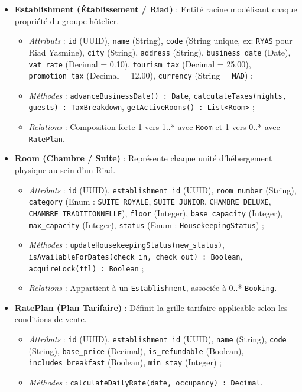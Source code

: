 \begin{itemize}
    \item \textbf{Establishment (Établissement / Riad)} : Entité racine modélisant chaque propriété du groupe hôtelier.
    \begin{itemize}
        \item \textit{Attributs} : \texttt{id} (UUID), \texttt{name} (String), \texttt{code} (String unique, ex: \texttt{RYAS} pour Riad Yasmine), \texttt{city} (String), \texttt{address} (String), \texttt{business\_date} (Date), \texttt{vat\_rate} (Decimal = 0.10), \texttt{tourism\_tax} (Decimal = 25.00), \texttt{promotion\_tax} (Decimal = 12.00), \texttt{currency} (String = \texttt{MAD}) ;
        \item \textit{Méthodes} : \texttt{advanceBusinessDate() : Date}, \texttt{calculateTaxes(nights, guests) : TaxBreakdown}, \texttt{getActiveRooms() : List<Room>} ;
        \item \textit{Relations} : Composition forte 1 vers 1..* avec \texttt{Room} et 1 vers 0..* avec \texttt{RatePlan}.
    \end{itemize}
    
    \item \textbf{Room (Chambre / Suite)} : Représente chaque unité d'hébergement physique au sein d'un Riad.
    \begin{itemize}
        \item \textit{Attributs} : \texttt{id} (UUID), \texttt{establishment\_id} (UUID), \texttt{room\_number} (String), \texttt{category} (Enum : \texttt{SUITE\_ROYALE}, \texttt{SUITE\_JUNIOR}, \texttt{CHAMBRE\_DELUXE}, \texttt{CHAMBRE\_TRADITIONNELLE}), \texttt{floor} (Integer), \texttt{base\_capacity} (Integer), \texttt{max\_capacity} (Integer), \texttt{status} (Enum : \texttt{HousekeepingStatus}) ;
        \item \textit{Méthodes} : \texttt{updateHousekeepingStatus(new\_status)}, \texttt{isAvailableForDates(check\_in, check\_out) : Boolean}, \texttt{acquireLock(ttl) : Boolean} ;
        \item \textit{Relations} : Appartient à un \texttt{Establishment}, associée à 0..* \texttt{Booking}.
    \end{itemize}

    \item \textbf{RatePlan (Plan Tarifaire)} : Définit la grille tarifaire applicable selon les conditions de vente.
    \begin{itemize}
        \item \textit{Attributs} : \texttt{id} (UUID), \texttt{establishment\_id} (UUID), \texttt{name} (String), \texttt{code} (String), \texttt{base_price} (Decimal), \texttt{is\_refundable} (Boolean), \texttt{includes\_breakfast} (Boolean), \texttt{min\_stay} (Integer) ;
        \item \textit{Méthodes} : \texttt{calculateDailyRate(date, occupancy) : Decimal}.
    \end{itemize}


\end{itemize}
